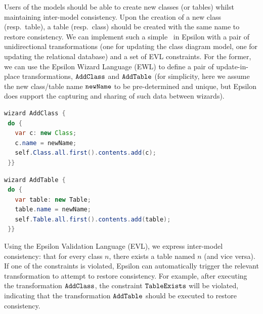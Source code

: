 	Users of the models should be able to create new classes (or tables) whilst maintaining inter-model consistency. Upon the creation of a new class (resp.\ table), a table (resp.\ class) should be created with the same name to restore consistency. We can implement such a simple \BX\ in Epsilon with a pair of unidirectional transformations (one for updating the class diagram model, one for updating the relational database) and a set of EVL constraints. For the former, we can use the Epsilon Wizard Language (EWL) to define a pair of update-in-place transformations, $\tt AddClass$ and $\tt AddTable$ (for simplicity, here we assume the new class/table name $\tt newName$ to be pre-determined and unique, but Epsilon does support the capturing and sharing of such data between wizards).
	
	\begin{lstlisting}[language=java]
wizard AddClass {
 do {
   var c: new Class;
   c.name = newName;
   self.Class.all.first().contents.add(c);
 }}
 \end{lstlisting}
	\hspace{7pt}
	\begin{lstlisting}[language=java]
wizard AddTable {
 do {
   var table: new Table;
   table.name = newName;
   self.Table.all.first().contents.add(table);
 }}
	\end{lstlisting}
%

Using the Epsilon Validation Language (EVL), we express inter-model consistency: that for every class $n$, there exists a table named $n$ (and vice versa). If one of the constraints is violated, Epsilon can automatically trigger the relevant transformation to attempt to restore consistency. For example, after executing the transformation $\tt AddClass$, the constraint $\tt TableExists$ will be violated, indicating that the transformation $\tt AddTable$ should be executed to restore consistency.
	
